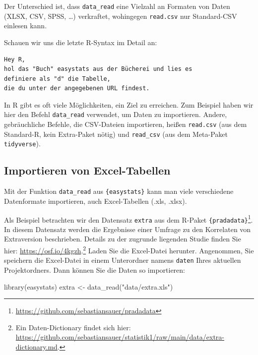 \documentclass[
  letterpaper,
  twoside,
  open=any]{scrbook}
\newenvironment{Shaded}{\begin{snugshade}}{\end{snugshade}}
\newcommand{\FunctionTok}[1]{\textcolor[rgb]{0.28,0.35,0.67}{#1}}
\newcommand{\NormalTok}[1]{\textcolor[rgb]{0.00,0.23,0.31}{#1}}
\newcommand{\OtherTok}[1]{\textcolor[rgb]{0.00,0.23,0.31}{#1}}
\newcommand{\StringTok}[1]{\textcolor[rgb]{0.13,0.47,0.30}{#1}}
\theoremstyle{definition}
\theoremstyle{definition}
\theoremstyle{definition}
\theoremstyle{remark}
\begin{document}
Der Unterschied ist, dass \texttt{data\_read} eine Vielzahl an Formaten
von Daten (XLSX, CSV, SPSS, \ldots) verkraftet, wohingegen
\texttt{read.csv} nur Standard-CSV einlesen kann.

Schauen wir uns die letzte R-Syntax im Detail an:

\begin{verbatim}
Hey R,
hol das "Buch" easystats aus der Bücherei und lies es
definiere als "d" die Tabelle,
die du unter der angegebenen URL findest.
\end{verbatim}

In R gibt es oft viele Möglichkeiten, ein Ziel zu erreichen. Zum
Beispiel haben wir hier den Befehl \texttt{data\_read} verwendet, um
Daten zu importieren. Andere, gebräuchliche Befehle, die CSV-Dateien
importieren, heißen \texttt{read.csv} (aus dem Standard-R, kein
Extra-Paket nötig) und \texttt{read\_csv} (aus dem Meta-Paket
\texttt{tidyverse}).

\subsection{Importieren von
Excel-Tabellen}\label{importieren-von-excel-tabellen}

Mit der Funktion \texttt{data\_read} aus \texttt{\{easystats\}} kann man
viele verschiedene Datenformate importieren, auch Excel-Tabellen (.xls,
.xlsx).

Als Beispiel betrachten wir den Datensatz \texttt{extra} aus dem R-Paket
\texttt{\{pradadata\}}\footnote{\url{https://github.com/sebastiansauer/pradadata}}.
In diesem Datensatz werden die Ergebnisse einer Umfrage zu den
Korrelaten von Extraversion beschrieben. Details zu der zugrunde
liegenden Studie finden Sie hier: \url{https://osf.io/4kgzh}.\footnote{Ein
  Daten-Dictionary findet sich hier:
  \url{https://github.com/sebastiansauer/statistik1/raw/main/data/extra-dictionary.md}.}
Laden Sie die Excel-Datei herunter. Angenommen, Sie speichern die
Excel-Datei in einem Unterordner namens \texttt{daten} Ihres aktuellen
Projektordners. Dann können Sie die Daten so importieren:

\begin{Shaded}
\begin{Highlighting}[]
\FunctionTok{library}\NormalTok{(easystats)}
\NormalTok{extra }\OtherTok{\textless{}{-}} \FunctionTok{data\_read}\NormalTok{(}\StringTok{"data/extra.xls"}\NormalTok{)}
\end{Highlighting}
\end{Shaded}
\end{document}
